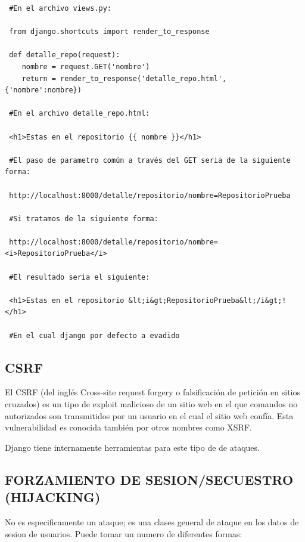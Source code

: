 \begin{verbatim}
 #En el archivo views.py:
 
 from django.shortcuts import render_to_response
 
 def detalle_repo(request):
 	nombre = request.GET('nombre')
	return = render_to_response('detalle_repo.html', {'nombre':nombre})

 #En el archivo detalle_repo.html:

 <h1>Estas en el repositorio {{ nombre }}</h1>

 #El paso de parametro común a través del GET seria de la siguiente forma: 

 http://localhost:8000/detalle/repositorio/nombre=RepositorioPrueba

 #Si tratamos de la siguiente forma:

 http://localhost:8000/detalle/repositorio/nombre=<i>RepositorioPrueba</i>

 #El resultado seria el siguiente:

 <h1>Estas en el repositorio &lt;i&gt;RepositorioPrueba&lt;/i&gt;!</h1>

 #En el cual django por defecto a evadido 

\end{verbatim}

\subsection{CSRF}

El CSRF (del inglés Cross-site request forgery o falsificación de petición en sitios cruzados) es un tipo de exploit malicioso de un sitio web en el que comandos no autorizados son transmitidos por un usuario en el cual el sitio web confía. Esta vulnerabilidad es conocida también por otros nombres como XSRF.

Django tiene internamente herramientas para este tipo de de ataques.

\subsection{FORZAMIENTO DE SESION/SECUESTRO (HIJACKING)}

No es especificamente un ataque; es una clases general de ataque en los datos de sesion de usuarios. Puede tomar un numero de diferentes formas:

